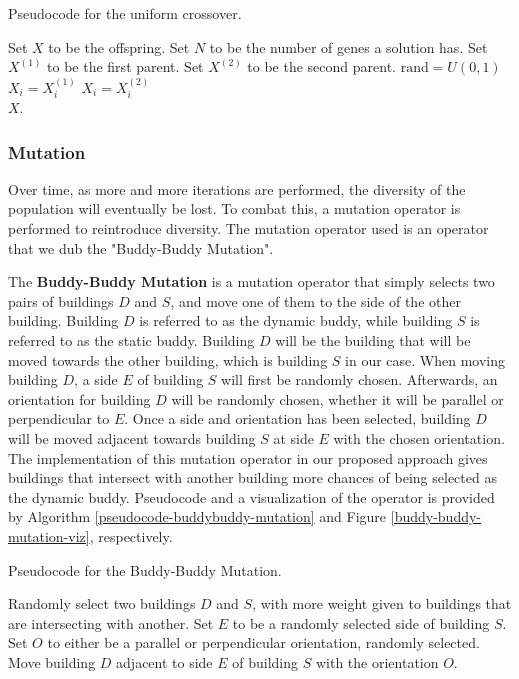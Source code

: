 \begin{algorithm}
\caption{Pseudocode for the uniform crossover.}
\label{pseudocode-uniform-crossover}
\begin{algorithmic}[1]
\State Set $X$ to be the offspring.
\State Set $N$ to be the number of genes a solution has.
\State Set $X^{(1)}$ to be the first parent.
\State Set $X^{(2)}$ to be the second parent.
	\State $\text{rand} = U(0, 1)$
		\State $X_{i} = X^{(1)}_{i}$
	\Else
		\State $X_{i} = X^{(2)}_{i}$
	\EndIf
\EndFor \\
\Return $X$.
\end{algorithmic}
\end{algorithm}

\subsubsection{Mutation}
Over time, as more and more iterations are performed, the diversity of the population will eventually be lost. To combat this, a mutation operator is performed to reintroduce diversity. The mutation operator used is an operator that we dub the "Buddy-Buddy Mutation".

The \textbf{Buddy-Buddy Mutation} is a mutation operator that simply selects two pairs of buildings $D$ and $S$, and move one of them to the side of the other building. Building $D$ is referred to as the dynamic buddy, while building $S$ is referred to as the static buddy. Building $D$ will be the building that will be moved towards the other building, which is building $S$ in our case. When moving building $D$, a side $E$ of building $S$ will first be randomly chosen. Afterwards, an orientation for building $D$ will be randomly chosen, whether it will be parallel or perpendicular to $E$. Once a side and orientation has been selected, building $D$ will be moved adjacent towards building $S$ at side $E$ with the chosen orientation. The implementation of this mutation operator in our proposed approach gives buildings that intersect with another building more chances of being selected as the dynamic buddy. Pseudocode and a visualization of the operator is provided by Algorithm \ref{pseudocode-buddybuddy-mutation} and Figure \ref{buddy-buddy-mutation-viz}, respectively.

\begin{algorithm}
\caption{Pseudocode for the Buddy-Buddy Mutation.}
\label{pseudocode-buddybuddy-mutation}
\begin{algorithmic}[1]
	\State Randomly select two buildings $D$ and $S$, with more weight given to buildings that are intersecting with another.
	\State Set $E$ to be a randomly selected side of building $S$.
	\State Set $O$ to either be a parallel or perpendicular orientation, randomly selected.
	\State Move building $D$ adjacent to side $E$ of building $S$ with the orientation $O$.
\end{algorithmic}
\end{algorithm}

